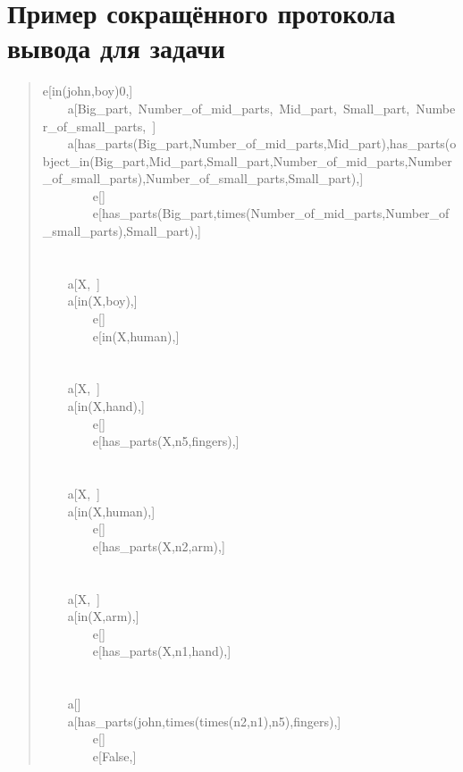 \section{Пример сокращённого протокола вывода для задачи}
\begin{quote}
\tt\raggedright\noindent
e[in(john,boy)0,]\\
~~~~a[Big\_part,~Number\_of\_mid\_parts,~Mid\_part,~Small\_part,~Number\_of\_small\_parts,~]\\
~~~~a[has\_parts(Big\_part,Number\_of\_mid\_parts,Mid\_part),has\_parts(object\_in(Big\_part,Mid\_part,Small\_part,Number\_of\_mid\_parts,Number\_of\_small\_parts),Number\_of\_small\_parts,Small\_part),]\\
~~~~~~~~e[]\\
~~~~~~~~e[has\_parts(Big\_part,times(Number\_of\_mid\_parts,Number\_of\_small\_parts),Small\_part),]\\
~\\
~\\
~~~~a[X,~]\\
~~~~a[in(X,boy),]\\
~~~~~~~~e[]\\
~~~~~~~~e[in(X,human),]\\
~\\
~\\
~~~~a[X,~]\\
~~~~a[in(X,hand),]\\
~~~~~~~~e[]\\
~~~~~~~~e[has\_parts(X,n5,fingers),]\\
~\\
~\\
~~~~a[X,~]\\
~~~~a[in(X,human),]\\
~~~~~~~~e[]\\
~~~~~~~~e[has\_parts(X,n2,arm),]\\
~\\
~\\
~~~~a[X,~]\\
~~~~a[in(X,arm),]\\
~~~~~~~~e[]\\
~~~~~~~~e[has\_parts(X,n1,hand),]\\
~\\
~\\
~~~~a[]\\
~~~~a[has\_parts(john,times(times(n2,n1),n5),fingers),]\\
~~~~~~~~e[]\\
~~~~~~~~e[False,]\\

\end{quote}
